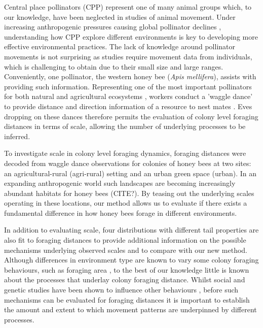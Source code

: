 \documentclass[11pt,usenames,dvipsnames,a4paper]{article}
\begin{document}
\begin{linenumbers}
Central place pollinators (CPP) represent one of many animal groups which, to our knowledge, have been neglected in studies of animal movement. Under increasing anthropogenic pressures causing global pollinator declines \citep{Powney2019}, understanding how CPP explore different environments is key to developing more effective environmental practices. The lack of knowledge around pollinator movements is not surprising as studies require movement data from individuals, which is challenging to obtain due to their small size and large ranges. Conveniently, one pollinator, the western honey bee (\textit{Apis mellifera}), assists with providing such information. Representing one of the most important pollinators for both natural and agricultural ecosystems \citep{Albrecht2018}, workers conduct a 'waggle dance' to provide distance and direction information of a resource to nest mates \citep{Seeley1995}. Eves dropping on these dances therefore permits the evaluation of colony level foraging distances in terms of scale, allowing the number of underlying processes to be inferred.

To investigate scale in colony level foraging dynamics, foraging distances were decoded from waggle dance observations for colonies of honey bees at two sites: an agricultural-rural (agri-rural) setting and an urban green space (urban). In an expanding anthropogenic world such landscapes are becoming increasingly abundant habitats for honey bees (CITE?). By teasing out the underlying scales operating in these locations, our method allows us to evaluate if there exists a fundamental difference in how honey bees forage in different environments. 

In addition to evaluating scale, four distributions with different tail properties are also fit to foraging distances to provide additional information on the possible mechanisms underlying observed scales and to compare with our new method. Although differences in environment type are known to vary some colony foraging behaviours, such as foraging area \citep{Lecocq2015, Samuelson2018}, to the best of our knowledge little is known about the processes that underlay colony foraging distance. Whilst social and genetic studies have been shown to influence other behaviours \citep{Fewell1993, Page1998, Sherman2002, Jones2004, Gruter2009}, before such mechanisms can be evaluated for foraging distances it is important to establish the amount and extent to which movement patterns are underpinned by different processes.


\end{linenumbers}
\end{document}
